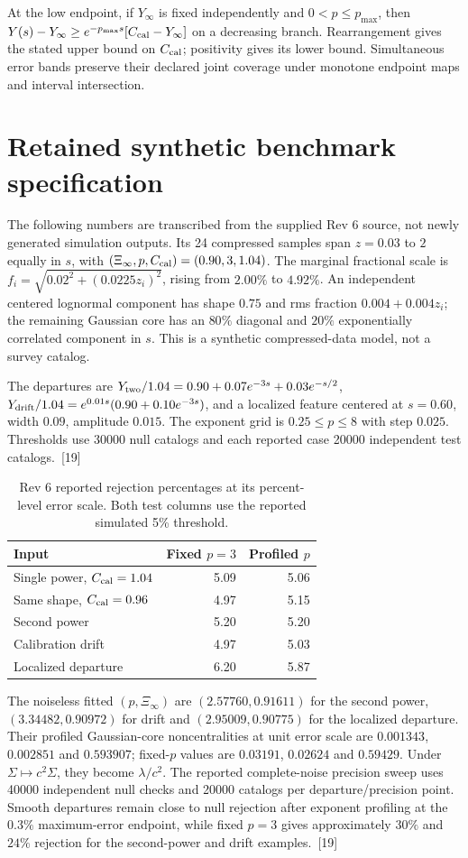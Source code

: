 \documentclass[10pt,twocolumn,letterpaper]{article}
\begin{document}
At the low endpoint, if $Y_\infty$ is fixed independently and $0<p\le p_{\max}$, then $Y(s)-Y_\infty\ge e^{-p_{\max}s}[C_{\rm cal}-Y_\infty]$ on a decreasing branch. Rearrangement gives the stated upper bound on $C_{\rm cal}$; positivity gives its lower bound. Simultaneous error bands preserve their declared joint coverage under monotone endpoint maps and interval intersection.

\section{Retained synthetic benchmark specification}\label{app:benchmark}
The following numbers are transcribed from the supplied Rev 6 source, not newly generated simulation outputs. Its 24 compressed samples span $z=0.03$ to $2$ equally in $s$, with $(\Xi_\infty,p,C_{\rm cal})=(0.90,3,1.04)$. The marginal fractional scale is $f_i=\sqrt{0.02^2+(0.0225z_i)^2}$, rising from $2.00\%$ to $4.92\%$. An independent centered lognormal component has shape $0.75$ and rms fraction $0.004+0.004z_i$; the remaining Gaussian core has an $80\%$ diagonal and $20\%$ exponentially correlated component in $s$. This is a synthetic compressed-data model, not a survey catalog.

The departures are $Y_{\rm two}/1.04=0.90+0.07e^{-3s}+0.03e^{-s/2}$, $Y_{\rm drift}/1.04=e^{0.01s}(0.90+0.10e^{-3s})$, and a localized feature centered at $s=0.60$, width $0.09$, amplitude $0.015$. The exponent grid is $0.25\le p\le 8$ with step $0.025$. Thresholds use 30000 null catalogs and each reported case 20000 independent test catalogs.~[19]

\begin{table}[htbp]\centering\small
\caption{Rev 6 reported rejection percentages at its percent-level error scale. Both test columns use the reported simulated 5\% threshold.}
\begin{tabular}{@{}lrr@{}}\toprule
Input & Fixed $p=3$ & Profiled $p$\\\midrule
Single power, $C_{\rm cal}=1.04$ &5.09&5.06\\
Same shape, $C_{\rm cal}=0.96$ &4.97&5.15\\
Second power &5.20&5.20\\
Calibration drift &4.97&5.03\\
Localized departure &6.20&5.87\\\bottomrule
\end{tabular}\end{table}
The noiseless fitted $(p,\Xi_\infty)$ are $(2.57760,0.91611)$ for the second power, $(3.34482,0.90972)$ for drift and $(2.95009,0.90775)$ for the localized departure. Their profiled Gaussian-core noncentralities at unit error scale are $0.001343$, $0.002851$ and $0.593907$; fixed-$p$ values are $0.03191$, $0.02624$ and $0.59429$. Under $\Sigma\mapsto c^2\Sigma$, they become $\lambda/c^2$. The reported complete-noise precision sweep uses 40000 independent null checks and 20000 catalogs per departure/precision point. Smooth departures remain close to null rejection after exponent profiling at the $0.3\%$ maximum-error endpoint, while fixed $p=3$ gives approximately $30\%$ and $24\%$ rejection for the second-power and drift examples.~[19]
\end{document}
